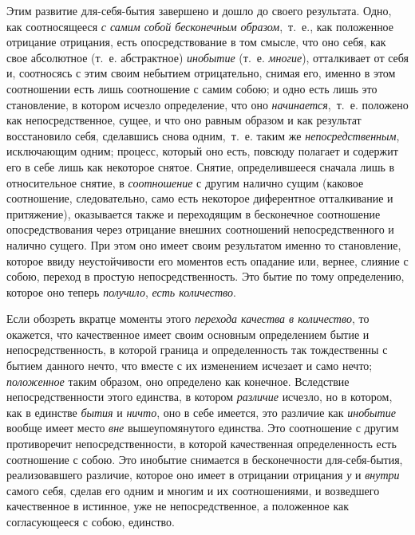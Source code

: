 Этим развитие для-себя-бытия завершено и дошло до своего результата. Одно,
как соотносящееся {\em с самим собой бесконечным
образом},~т.~е., как положенное отрицание отрицания, есть опосредствование
в том смысле, что оно себя, как свое абсолютное (т.~е. абстрактное)
{\em инобытие} (т.~е.
{\em многие}), отталкивает от себя и, соотносясь с этим
своим небытием отрицательно, снимая его, именно в этом соотношении есть
лишь соотношение с самим собою; и одно есть лишь это становление, в котором
исчезло определение, что оно {\em начинается},~т.~е.
положено как непосредственное, сущее, и что оно равным образом и как
результат восстановило себя, сделавшись снова одним,~т.~е. таким же
{\em непосредственным}, исключающим одним; процесс,
который оно есть, повсюду полагает и содержит его в себе лишь как некоторое
снятое. Снятие, определившееся сначала лишь в относительное снятие, в
{\em соотношение} с другим налично сущим (каковое
соотношение, следовательно, само есть некоторое диферентное отталкивание и
притяжение), оказывается также и переходящим в бесконечное соотношение
опосредствования через отрицание внешних соотношений непосредственного и
налично сущего. При этом оно имеет своим результатом именно то становление,
которое ввиду неустойчивости его моментов есть опадание или, вернее,
слияние с собою, переход в простую непосредственность. Это бытие по тому
определению, которое оно теперь {\em получило},
{\em есть количество}.

Если обозреть вкратце моменты этого {\em перехода
качества в количество}, то окажется, что качественное имеет своим основным
определением бытие и непосредственность, в которой граница и определенность
так тождественны с бытием данного нечто, что вместе с их изменением
исчезает и само нечто; {\em положенное} таким образом,
оно определено как конечное. Вследствие непосредственности этого единства,
в котором {\em различие} исчезло, но в котором, как в
единстве {\em бытия} и {\em ничто},
оно в себе имеется, это различие как {\em инобытие}
вообще имеет место {\em вне} вышеупомянутого единства.
Это соотношение с другим противоречит непосредственности, в которой
качественная определенность есть соотношение с собою. Это инобытие
снимается в бесконечности для-себя-бытия, реализовавшего различие, которое
оно имеет в отрицании отрицания {\em у} и
{\em внутри} самого себя, сделав его одним и многим и
их соотношениями, и возведшего качественное в истинное, уже не
непосредственное, а положенное как согласующееся с собою, единство.

